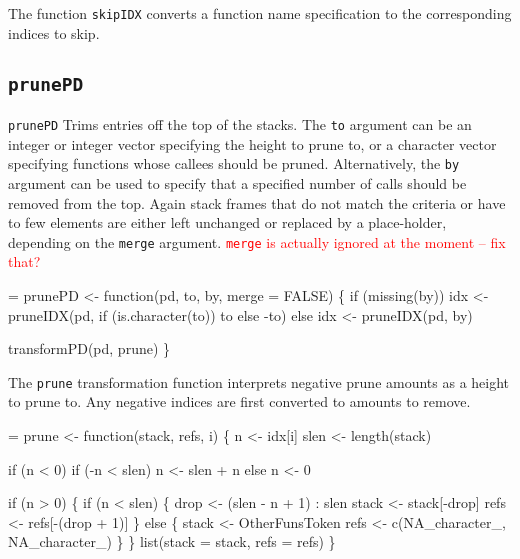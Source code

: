 \documentclass[11pt]{article}
\newcommand{\FIXME}[1]{\textcolor{red}{#1}}
\begin{document}
The function \Verb!skipIDX! converts a function name specification to the
corresponding indices to skip.

\subsection{\texttt{prunePD}}
\Verb!prunePD! Trims entries off the top of the stacks. The \Verb?to?
argument can be an integer or integer vector specifying the height to
prune to, or a character vector specifying functions whose callees
should be pruned.  Alternatively, the \Verb!by! argument can be used to
specify that a specified number of calls should be removed from the
top. Again stack frames that do not match the criteria or have to few
elements are either left unchanged or replaced by a place-holder,
depending on the \Verb!merge! argument.
\FIXME{\Verb!merge! is actually ignored at the moment -- fix that?}
\begin{nwchunk}
=
 prunePD <- function(pd, to, by, merge = FALSE) \{
     if (missing(by))
         idx <- pruneIDX(pd, if (is.character(to)) to else -to)
     else
         idx <- pruneIDX(pd, by)
 
 
     transformPD(pd, prune)
 \}
\end{nwchunk}
The \Verb!prune! transformation function interprets negative prune
amounts as a height to prune to. Any negative indices are first
converted to amounts to remove.
\begin{nwchunk}
=
 prune <- function(stack, refs, i) \{
     n <- idx[i]
     slen <- length(stack)
 
     if (n < 0)
         if (-n < slen)
             n <- slen + n
         else
             n <- 0
 
     if (n > 0) \{
         if (n < slen) \{
             drop <- (slen - n + 1) : slen
             stack <- stack[-drop]
             refs <- refs[-(drop + 1)]
         \}
         else \{
             stack <- OtherFunsToken
             refs <- c(NA_character_, NA_character_)
         \}
     \}
     list(stack = stack, refs = refs)
 \}
\end{nwchunk}
\end{document}
